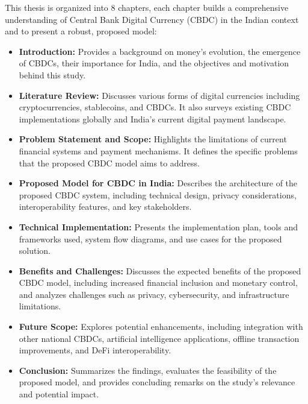 This thesis is organized into 8 chapters, each chapter builds a comprehensive understanding of Central Bank Digital Currency (CBDC) in the Indian context and to present a robust, proposed model: 

\begin{itemize}
    \item \textbf{Introduction:} Provides a background on money’s evolution, the emergence of CBDCs, their importance for India, and the objectives and motivation behind this study.

    \item \textbf{Literature Review:} Discusses various forms of digital currencies including cryptocurrencies, stablecoins, and CBDCs. It also surveys existing CBDC implementations globally and India’s current digital payment landscape.

    \item \textbf{Problem Statement and Scope:} Highlights the limitations of current financial systems and payment mechanisms. It defines the specific problems that the proposed CBDC model aims to address.

    \item \textbf{Proposed Model for CBDC in India:} Describes the architecture of the proposed CBDC system, including technical design, privacy considerations, interoperability features, and key stakeholders.

    \item \textbf{Technical Implementation:} Presents the implementation plan, tools and frameworks used, system flow diagrams, and use cases for the proposed solution.

    \item \textbf{Benefits and Challenges:} Discusses the expected benefits of the proposed CBDC model, including increased financial inclusion and monetary control, and analyzes challenges such as privacy, cybersecurity, and infrastructure limitations.

    \item \textbf{Future Scope:} Explores potential enhancements, including integration with other national CBDCs, artificial intelligence applications, offline transaction improvements, and DeFi interoperability.

    \item \textbf{ Conclusion:} Summarizes the findings, evaluates the feasibility of the proposed model, and provides concluding remarks on the study’s relevance and potential impact.
\end{itemize}


